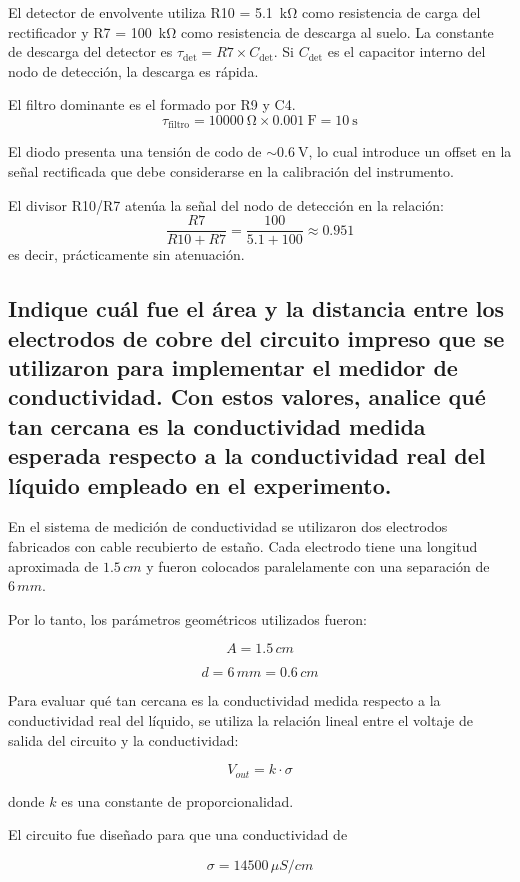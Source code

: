\documentclass[a4paper,openany,12pt]{book}
\begin{document}
El detector de envolvente utiliza R10 = \SI{5.1}{\kilo\ohm} como resistencia de carga del rectificador y R7 = \SI{100}{\kilo\ohm} como resistencia de descarga al suelo. La constante de descarga del detector es \(\tau_{\text{det}} = R7 \times C_{\text{det}}\). Si \(C_{\text{det}}\) es el capacitor interno del nodo de detección, la descarga es rápida.

El filtro dominante es el formado por R9 y C4.
\[
\tau_{\text{filtro}} = \SI{10000}{\ohm} \times \SI{0.001}{\farad} = \SI{10}{\second}
\]

El diodo  presenta una tensión de codo de \(\sim \SI{0.6}{\volt}\), lo cual introduce un offset en la señal rectificada que debe considerarse en la calibración del instrumento.

El divisor R10/R7 atenúa la señal del nodo de detección en la relación:
\[
\frac{R7}{R10 + R7} = \frac{100}{5.1 + 100} \approx 0.951
\]
es decir, prácticamente sin atenuación.


\subsection {Indique cuál fue el área y la distancia entre los electrodos de cobre del circuito impreso que se utilizaron para implementar el medidor de conductividad. Con estos valores, analice qué tan cercana es la conductividad medida esperada respecto a la conductividad real del líquido empleado en el experimento.}

En el sistema de medición de conductividad se utilizaron dos electrodos
fabricados con cable recubierto de estaño. Cada electrodo tiene una
longitud aproximada de \(1.5\,cm\) y fueron colocados paralelamente con
una separación de \(6\,mm\).

Por lo tanto, los parámetros geométricos utilizados fueron:

\[
A = 1.5\,cm
\]

\[
d = 6\,mm = 0.6\,cm
\]

Para evaluar qué tan cercana es la conductividad medida respecto a la
conductividad real del líquido, se utiliza la relación lineal entre el
voltaje de salida del circuito y la conductividad:

\[
V_{out} = k \cdot \sigma
\]

donde \(k\) es una constante de proporcionalidad.

El circuito fue diseñado para que una conductividad de

\[
\sigma = 14500 \, \mu S/cm
\]
\end{document}
